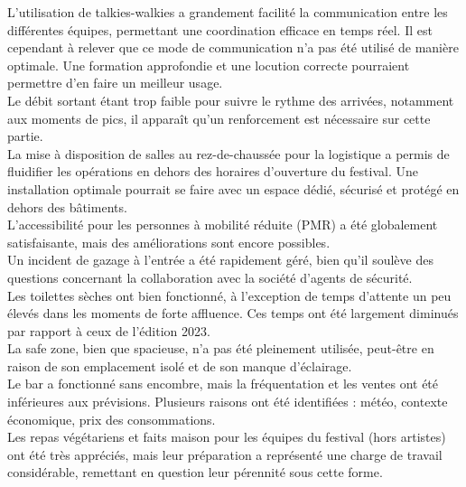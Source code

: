 \documentclass[12pt,a4paper]{report}
\begin{document}
L'utilisation de talkies-walkies a grandement facilité la communication entre les différentes équipes, permettant une coordination efficace en temps réel. Il est cependant à relever que ce mode de communication n’a pas été utilisé de manière optimale. Une formation approfondie et une locution correcte pourraient permettre d’en faire un meilleur usage.\\


Le débit sortant étant trop faible pour suivre le rythme des arrivées, notamment aux moments de pics, il apparaît qu’un renforcement est nécessaire sur cette partie.\\

La mise à disposition de salles au rez-de-chaussée pour la logistique a permis de fluidifier les opérations en dehors des horaires d'ouverture du festival. Une installation optimale pourrait se faire avec un espace dédié, sécurisé et protégé en dehors des bâtiments.\\

L'accessibilité pour les personnes à mobilité réduite (PMR) a été globalement satisfaisante, mais des améliorations sont encore possibles.\\

Un incident de gazage à l'entrée a été rapidement géré, bien qu'il soulève des questions concernant la collaboration avec la société d'agents de sécurité.\\

Les toilettes sèches ont bien fonctionné, à l'exception de temps d’attente un peu élevés dans les moments de forte affluence. Ces temps ont été largement diminués par rapport à ceux de l’édition 2023.\\

La safe zone, bien que spacieuse, n'a pas été pleinement utilisée, peut-être en raison de son emplacement isolé et de son manque d'éclairage.\\

Le bar a fonctionné sans encombre, mais la fréquentation et les ventes ont été inférieures aux prévisions. Plusieurs raisons ont été identifiées : météo, contexte économique, prix des consommations.\\

Les repas végétariens et faits maison pour les équipes du festival (hors artistes) ont été très appréciés, mais leur préparation a représenté une charge de travail considérable, remettant en question leur pérennité sous cette forme.\\
\end{document}

